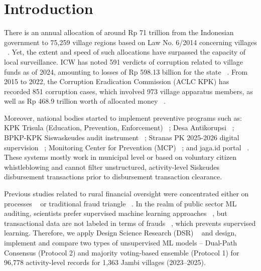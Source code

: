 \documentclass[conference]{IEEEtran}
\begin{document}
\section{Introduction}

There is an annual allocation of around Rp 71 trillion from the Indonesian government to 75,259 village regions based on Law No. 6/2014 concerning villages ~\cite{ref1}. Yet, the extent and speed of such allocations have surpassed the capacity of local surveillance. ICW has noted 591 verdicts of corruption related to village funds as of 2024, amounting to losses of Rp 598.13 billion for the state ~\cite{ref2}. From 2015 to 2022, the Corruption Eradication Commission (ACLC KPK) has recorded 851 corruption cases, which involved 973 village apparatus members, as well as Rp 468.9 trillion worth of allocated money ~\cite{ref3}.

Moreover, national bodies started to implement preventive programs such as: KPK Trisula (Education, Prevention, Enforcement) ~\cite{ref36}; Desa Antikorupsi ~\cite{ref37}; BPKP-KPK Siswaskeudes audit instrument ~\cite{ref38}; Stranas PK 2025-2026 digital supervision ~\cite{ref39}; Monitoring Center for Prevention (MCP) ~\cite{ref40}; and jaga.id portal ~\cite{ref26}. These systems mostly work in municipal level or based on voluntary citizen whistleblowing and cannot filter unstructured, activity-level Siskeudes disbursement transactions prior to disbursement transaction clearance.

Previous studies related to rural financial oversight were concentrated either on processes ~\cite{ref4,ref5} or traditional fraud triangle ~\cite{ref6}. In the realm of public sector ML auditing, scientists prefer supervised machine learning approaches ~\cite{ref13,ref14}, but transactional data are not labeled in terms of frauds ~\cite{ref16,ref23}, which prevents supervised learning. Therefore, we apply Design Science Research (DSR) ~\cite{ref5,ref10} and design, implement and compare two types of unsupervised ML models – Dual-Path Consensus (Protocol 2) and majority voting-based ensemble (Protocol 1) for 96,778 activity-level records for 1,363 Jambi villages (2023–2025).
\end{document}
